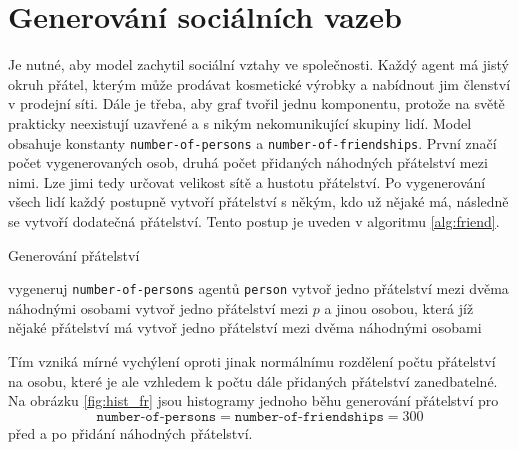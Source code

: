 \documentclass[a4wide,12pt]{report}
\begin{document}
\section{Generování sociálních vazeb}
Je nutné, aby model zachytil sociální vztahy ve společnosti. Každý agent má jistý okruh přátel, kterým může prodávat kosmetické výrobky a nabídnout jim členství v prodejní síti. Dále je třeba, aby graf tvořil jednu komponentu, protože na světě prakticky neexistují uzavřené a s nikým nekomunikující skupiny lidí. Model obsahuje konstanty \texttt{number-of-persons} a \texttt{number-of-friendships}. První značí počet vygenerovaných osob, druhá počet přidaných náhodných přátelství mezi nimi. Lze jimi tedy určovat velikost sítě a hustotu přátelství. Po vygenerování všech lidí každý postupně vytvoří přátelství s někým, kdo už nějaké má, následně se vytvoří dodatečná přátelství. Tento postup je uveden v algoritmu \ref{alg:friend}.
\begin{algorithm}
\caption{Generování přátelství}
\label{alg:friend}
\begin{algorithmic}
\STATE vygeneruj \texttt{number-of-persons} agentů \texttt{person}
\STATE vytvoř jedno přátelství mezi dvěma náhodnými osobami
  \STATE vytvoř jedno přátelství mezi $p$ a jinou osobou, která jíž nějaké přátelství má
\ENDFOR
{}
  \STATE vytvoř jedno přátelství mezi dvěma náhodnými osobami
\ENDFOR
\end{algorithmic}
\end{algorithm}
Tím vzniká mírné vychýlení oproti jinak normálnímu rozdělení počtu přátelství na osobu, které je ale vzhledem k počtu dále přidaných přátelství zanedbatelné. Na obrázku \ref{fig:hist_fr} jsou histogramy jednoho běhu generování přátelství pro \[\texttt{number-of-persons}=\texttt{number-of-friendships}=300\] před a po přidání náhodných přátelství.
\end{document}

